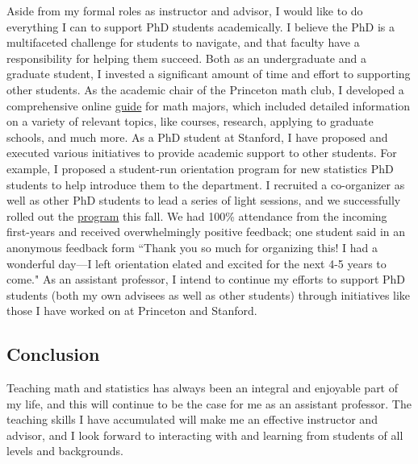 \documentclass[11pt]{article}
\begin{document}
Aside from my formal roles as instructor and advisor, I would like to do everything I can to support PhD students academically. I believe the PhD is a multifaceted challenge for students to navigate, and that faculty have a responsibility for helping them succeed. Both as an undergraduate and a graduate student, I invested a significant amount of time and effort to supporting other students. As the academic chair of the Princeton math club, I developed a comprehensive online \href{https://blogs.princeton.edu/mathclub/guide/}{guide} for math majors, which included detailed information on a variety of relevant topics, like courses, research, applying to graduate schools, and much more. As a PhD student at Stanford, I have proposed and executed various initiatives to provide academic support to other students. For example, I proposed a student-run orientation program for new statistics PhD students to help introduce them to the department. I recruited a co-organizer as well as other PhD students to lead a series of light sessions, and we successfully rolled out the \href{http://web.stanford.edu/~ekatsevi/stats_orientation/}{program} this fall. We had 100\% attendance from the incoming first-years and received overwhelmingly positive feedback; one student said in an anonymous feedback form ``Thank you so much for organizing this! I had a wonderful day---I left orientation elated and excited for the next 4-5 years to come." As an assistant professor, I intend to continue my efforts to support PhD students (both my own advisees as well as other students) through initiatives like those I have worked on at Princeton and Stanford.

\subsection*{Conclusion}

Teaching math and statistics has always been an integral and enjoyable part of my life, and this will continue to be the case for me as an assistant professor. The teaching skills I have accumulated will make me an effective instructor and advisor, and I look forward to interacting with and learning from students of all levels and backgrounds.
\end{document}
